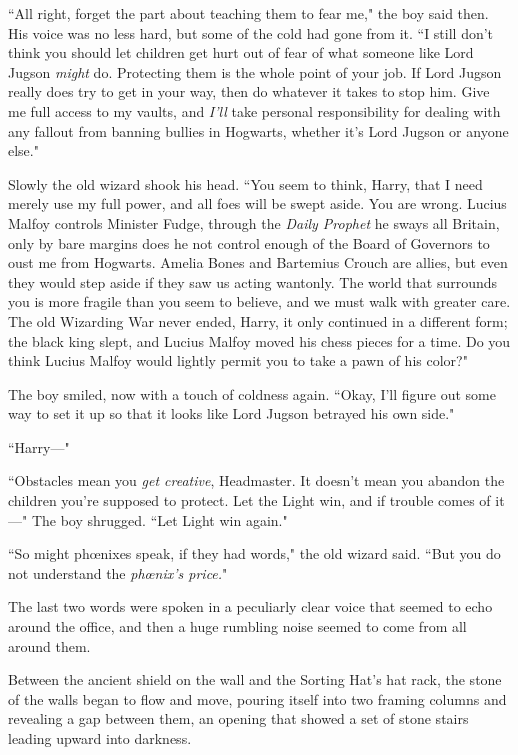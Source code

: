 ``All right, forget the part about teaching them to fear me," the boy said then. His voice was no less hard, but some of the cold had gone from it. ``I still don't think you should let children get hurt out of fear of what someone like Lord Jugson \emph{might} do. Protecting them is the whole point of your job. If Lord Jugson really does try to get in your way, then do whatever it takes to stop him. Give me full access to my vaults, and \emph{I'll} take personal responsibility for dealing with any fallout from banning bullies in Hogwarts, whether it's Lord Jugson or anyone else."

Slowly the old wizard shook his head. ``You seem to think, Harry, that I need merely use my full power, and all foes will be swept aside. You are wrong. Lucius Malfoy controls Minister Fudge, through the \emph{Daily Prophet} he sways all Britain, only by bare margins does he not control enough of the Board of Governors to oust me from Hogwarts. Amelia Bones and Bartemius Crouch are allies, but even they would step aside if they saw us acting wantonly. The world that surrounds you is more fragile than you seem to believe, and we must walk with greater care. The old Wizarding War never ended, Harry, it only continued in a different form; the black king slept, and Lucius Malfoy moved his chess pieces for a time. Do you think Lucius Malfoy would lightly permit you to take a pawn of his color?"

The boy smiled, now with a touch of coldness again. ``Okay, I'll figure out some way to set it up so that it looks like Lord Jugson betrayed his own side."

``Harry---"

``Obstacles mean you \emph{get creative}, Headmaster. It doesn't mean you abandon the children you're supposed to protect. Let the Light win, and if trouble comes of it---" The boy shrugged. ``Let Light win again."

``So might phœnixes speak, if they had words," the old wizard said. ``But you do not understand the \emph{phœnix's price.}"

The last two words were spoken in a peculiarly clear voice that seemed to echo around the office, and then a huge rumbling noise seemed to come from all around them.

Between the ancient shield on the wall and the Sorting Hat's hat rack, the stone of the walls began to flow and move, pouring itself into two framing columns and revealing a gap between them, an opening that showed a set of stone stairs leading upward into darkness.

